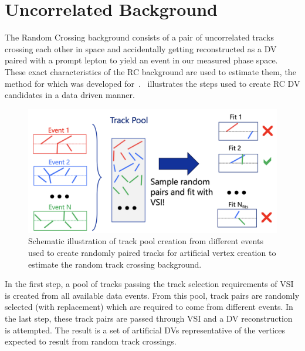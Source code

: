 \section{Uncorrelated Background}\label{sec:uncorr_bkg}
The Random Crossing background consists of a pair of uncorrelated tracks crossing each other in space and accidentally getting reconstructed as a DV paired with a prompt lepton to yield an event in our measured phase space. These exact characteristics of the RC background are used to estimate them, the method for which was developed for~\cite{Barlow:1749971}.~ illustrates the steps used to create RC DV candidates in a data driven manner.

\begin{figure}[!ht]
    \centering
    \includegraphics[width=\textwidth]{figures/analysis_strategy/random_crossing/rtc_scheme.png}
    \caption{Schematic illustration of track pool creation from different events used to create randomly paired tracks for artificial vertex creation to estimate the random track crossing background.}
    \label{fig:rc_method}
\end{figure}

In the first step, a pool of tracks passing the track selection requirements of VSI is created from all available data events. From this pool, track pairs are randomly selected (with replacement) which are required to come from different events. In the last step, these track pairs are passed through VSI and a DV reconstruction is attempted. The result is a set of artificial DVs representative of the vertices expected to result from random track crossings.

